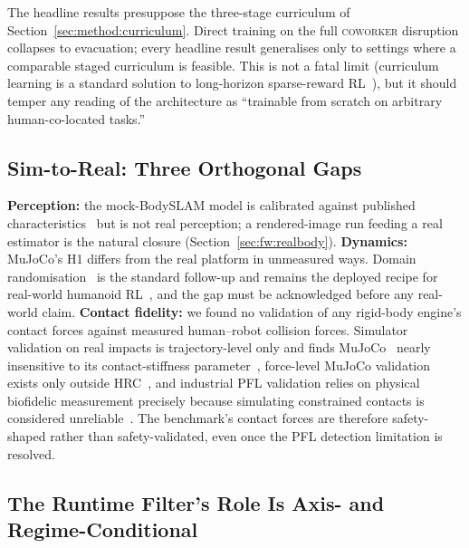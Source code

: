 \documentclass[11pt,a4paper]{report}
\newcommand{\pfl}{PFL}
\newcommand{\coworker}{\textsc{coworker}}
\newcommand{\bodyslampp}{BodySLAM\nolinebreak[4]\hspace{-.05em}\raisebox{.2ex}{\scriptsize ++}}
\begin{document}
The headline results presuppose the three-stage curriculum of
Section~\ref{sec:method:curriculum}. Direct training on the full
\coworker{} disruption collapses to evacuation; every headline
result generalises only to settings where a comparable staged
curriculum is feasible. This is not a fatal limit (curriculum
learning is a standard solution to long-horizon sparse-reward
RL~\cite{narvekar2020curriculum,openai2019solving,rudin2022walkminutes}), but it
should temper any reading of the architecture as ``trainable from
scratch on arbitrary human-co-located tasks.''

\subsection{Sim-to-Real: Three Orthogonal Gaps}
\label{sec:disc:sim2real}

\textbf{Perception:} the mock-\bodyslampp{} model is calibrated
against published characteristics~\cite{henning2023bodyslampp} but
is not real perception; a rendered-image run feeding a real
estimator is the natural closure
(Section~\ref{sec:fw:realbody}). \textbf{Dynamics:} MuJoCo's H1
differs from the real platform in unmeasured ways. Domain
randomisation~\cite{tobin2017domainrand,muratore2022randomized}
is the standard follow-up and remains the deployed recipe for
real-world humanoid RL~\cite{radosavovic2024humanoid}, and the gap
must be acknowledged before any real-world claim. \textbf{Contact
fidelity:} we found no validation of any rigid-body engine's contact
forces against measured human--robot collision forces.
Simulator validation on real impacts is trajectory-level only and
finds MuJoCo~\cite{todorov2012mujoco} nearly insensitive to its
contact-stiffness parameter~\cite{acosta2022simvalidation},
force-level MuJoCo validation exists only outside
HRC~\cite{joseph2026mujoco}, and industrial \pfl{} validation relies
on physical biofidelic measurement precisely because simulating
constrained contacts is considered
unreliable~\cite{schlotzhauer2022pfl,svarny2020collision}. The
benchmark's contact forces are therefore safety-shaped rather than
safety-validated, even once the \pfl{} detection limitation is
resolved.

\subsection{The Runtime Filter's Role Is Axis- and Regime-Conditional}
\label{sec:disc:filter-role}
\end{document}

